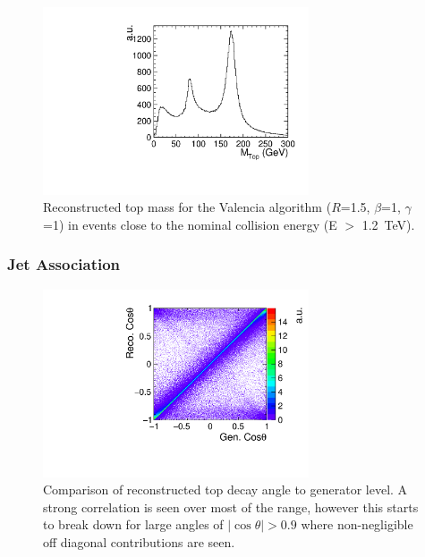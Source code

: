 \begin{figure}
  \centering
  \includegraphics[width=0.7\textwidth]{TopAnalysis/figures/TopMass_EOver1200.pdf}
  \caption[Performance of Valencia algorithm for high energy events]{Reconstructed top mass for the Valencia algorithm ($R$=1.5, $\beta$=1, $\gamma$=1) in events close to the nominal collision energy (E $>$ 1.2~TeV).}
  \label{fig:highEValencia}
\end{figure}


\subsubsection{Jet Association}
\label{sec:jetassociation}
\begin{figure}
  \centering
  \includegraphics[width=0.7\textwidth]{TopAnalysis/figures/CosThetaRecoVsMC.pdf}
  \caption[Comparison of reconstructed top decay angle to generator level]{Comparison of reconstructed top decay angle to generator level. A strong correlation is seen over most of the range, however this starts to break down for large angles of $\mid \cos\theta \mid>0.9$ where non-negligible off diagonal contributions are seen.}
  \label{fig:2djetangle}
\end{figure}

